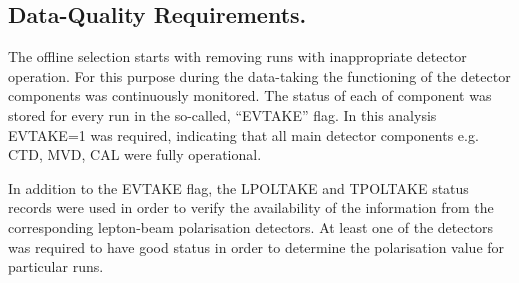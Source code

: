 \subsection{Data-Quality Requirements.}
The offline selection starts with removing runs with inappropriate detector operation. For this purpose during the data-taking the functioning of the detector components was continuously monitored. The status of each of component was stored for every run in the so-called, ``EVTAKE'' flag. In this analysis EVTAKE=1 was required, indicating that all main detector components e.g. CTD, MVD, CAL were fully operational.

In addition to the EVTAKE flag, the LPOLTAKE and TPOLTAKE status records were used in order to verify the availability of the information from the corresponding lepton-beam polarisation detectors. At least one of the detectors was required to have good status in order to determine the polarisation value for particular runs.

